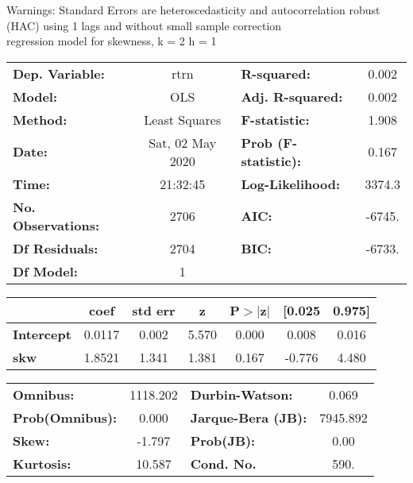 Warnings: \newline
 [1] Standard Errors are heteroscedasticity and autocorrelation robust (HAC) using 1 lags and without small sample correction\\ 

regression model for skewness, k = 2 h = 1\begin{center}
\begin{tabular}{lclc}
\toprule
\textbf{Dep. Variable:}    &       rtrn       & \textbf{  R-squared:         } &     0.002   \\
\textbf{Model:}            &       OLS        & \textbf{  Adj. R-squared:    } &     0.002   \\
\textbf{Method:}           &  Least Squares   & \textbf{  F-statistic:       } &     1.908   \\
\textbf{Date:}             & Sat, 02 May 2020 & \textbf{  Prob (F-statistic):} &    0.167    \\
\textbf{Time:}             &     21:32:45     & \textbf{  Log-Likelihood:    } &    3374.3   \\
\textbf{No. Observations:} &        2706      & \textbf{  AIC:               } &    -6745.   \\
\textbf{Df Residuals:}     &        2704      & \textbf{  BIC:               } &    -6733.   \\
\textbf{Df Model:}         &           1      & \textbf{                     } &             \\
\bottomrule
\end{tabular}
\begin{tabular}{lcccccc}
                   & \textbf{coef} & \textbf{std err} & \textbf{z} & \textbf{P$> |$z$|$} & \textbf{[0.025} & \textbf{0.975]}  \\
\midrule
\textbf{Intercept} &       0.0117  &        0.002     &     5.570  &         0.000        &        0.008    &        0.016     \\
\textbf{skw}       &       1.8521  &        1.341     &     1.381  &         0.167        &       -0.776    &        4.480     \\
\bottomrule
\end{tabular}
\begin{tabular}{lclc}
\textbf{Omnibus:}       & 1118.202 & \textbf{  Durbin-Watson:     } &    0.069  \\
\textbf{Prob(Omnibus):} &   0.000  & \textbf{  Jarque-Bera (JB):  } & 7945.892  \\
\textbf{Skew:}          &  -1.797  & \textbf{  Prob(JB):          } &     0.00  \\
\textbf{Kurtosis:}      &  10.587  & \textbf{  Cond. No.          } &     590.  \\
\bottomrule
\end{tabular}
\end{center}

